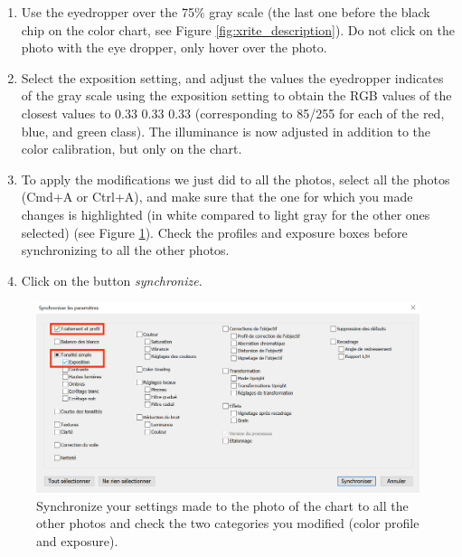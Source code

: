 \documentclass[10pt,letter,english]{article}
\begin{document}
\begin{enumerate}
    \item Use the eyedropper over the 75\% gray scale (the last one before the black chip on the color chart, see Figure \ref{fig:xrite_description}). Do not click on the photo with the eye dropper, only hover over the photo.
    \item Select the exposition setting, and adjust the values the eyedropper indicates of the gray scale using the exposition setting to obtain the RGB values of the closest values to 0.33 0.33 0.33 (corresponding to 85/255 for each of the red, blue, and green class). The illuminance is now adjusted in addition to the color calibration, but only on the chart.
    \item To apply the modifications we just did to all the photos, select all the photos (Cmd+A or Ctrl+A), and make sure that the one for which you made changes is highlighted (in white compared to light gray for the other ones selected) (see Figure \ref{fig:synchronize}). Check the profiles and exposure boxes before synchronizing to all the other photos.
    \item Click on the button \textit{synchronize}.
\end{enumerate}




\begin{figure}[H]
    \centering
    \includegraphics[width=1\linewidth]{Figures/synchronize_capture.png}
    \caption{Synchronize your settings made to the photo of the chart to all the other photos and check the two categories you modified (color profile and exposure).}
    \label{fig:synchronize}
\end{figure}
\end{document}
